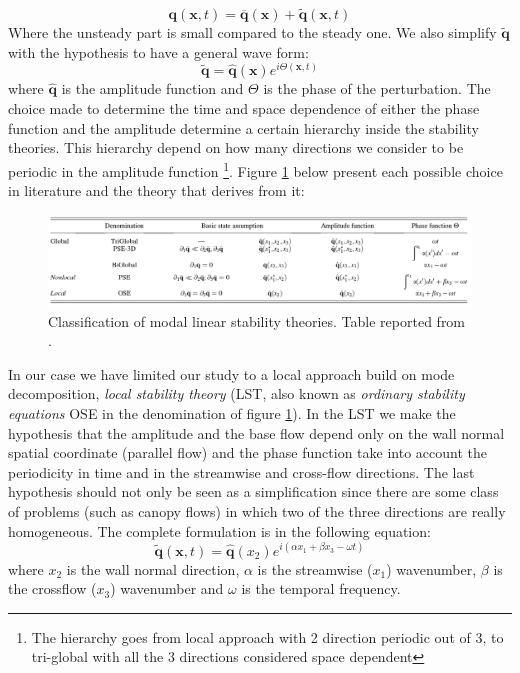 $$ \mathbf{q} (\mathbf{x},t)= \overline{\mathbf{q}} (\mathbf{x}) + \widetilde{\mathbf{q}} (\mathbf{x},t) $$
Where the unsteady part is small compared to the steady one. We also simplify $\widetilde{\mathbf{q}}$ with the hypothesis to have a general wave form:
$$  \widetilde{\mathbf{q}} =  \widehat{\mathbf{q}}(\mathbf{x}) e^{i\Theta(\mathbf{x},t)} $$
where $\widehat{\mathbf{q}}$ is the amplitude function and $\Theta$ is the phase of the perturbation.
The choice made to determine the time and space dependence of either the phase function and the amplitude determine a certain hierarchy inside the stability theories. This hierarchy depend on how many directions we consider to be periodic in the amplitude function \footnote{The hierarchy goes from local approach with 2 direction periodic out of 3, to tri-global with all the 3 directions considered space dependent}.
Figure \ref{fig:table} below present each possible choice in literature and the theory that derives from it:

\begin{figure}[h]
	\centering
	\includegraphics[width=1\linewidth]{chapter_1/table}
	\caption{Classification of modal linear stability theories. Table reported from \citet{juniper2014modal}.}
	\label{fig:table}
\end{figure}
 
In our case we have limited our study to a local approach build on mode decomposition, \textit{local stability theory} (LST, also known as \textit{ordinary stability equations} OSE in the denomination of figure \ref{fig:table}).
In the LST we make the hypothesis that the amplitude and the base flow depend only on the wall normal spatial coordinate (parallel flow) and the phase function take into account the periodicity in time and in the streamwise and cross-flow directions.
The last hypothesis should not only be seen as a simplification since there are some class of problems (such as canopy flows) in which two of the three directions are really homogeneous.
The complete formulation is in the following equation:
 $$  \widetilde{\mathbf{q}}(\mathbf{x},t) =  \widehat{\mathbf{q}}(x_2) e^{i(\alpha x_1 + \beta x_3 - \omega t)}  $$ 
where $x_2$ is the wall normal direction, $\alpha$ is the streamwise ($x_1$) wavenumber, $\beta$ is the crossflow ($x_3$) wavenumber and $\omega$ is the temporal frequency.

